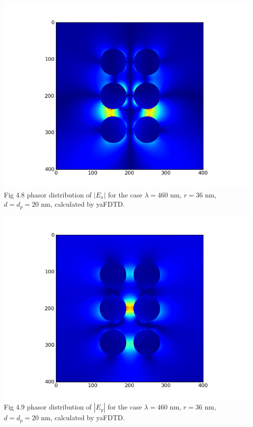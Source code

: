 \documentclass[openany]{book}
\begin{document}
\begin{center}
\includegraphics[scale=0.8]{images/ex.png}\\
Fig 4.8
phasor distribution of $|E_x|$ for the case $\lambda = 460$ nm, $r = 36$ nm, $d = d_p = 20$ nm, calculated by yaFDTD.
\end{center}

\begin{center}
\includegraphics[scale=0.8]{images/ey.png}\\
Fig 4.9
phasor distribution of $|E_y|$ for the case $\lambda = 460$ nm, $r = 36$ nm, $d = d_p = 20$ nm, calculated by yaFDTD.
\end{center}
\end{document}
